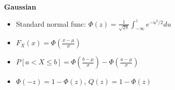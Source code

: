\documentclass[8pt]{article}
\begin{document}
\textbf{Gaussian}
\begin{itemize}
    \item Standard normal func: $\Phi(z) = \frac{1}{\sqrt{2 \pi}} \int_{-\infty}^z e^{-u^2/2} du$
    \item $F_X(x) = \Phi\left(\frac{x - \mu}{\sigma}\right)$
    \item $P[a < X \leq b] = \Phi\left(\frac{b - \mu}{\sigma}\right) - \Phi\left(\frac{a - \mu}{\sigma}\right)$
    \item $\Phi(-z) = 1 - \Phi(z)$, $Q(z) = 1 - \Phi(z)$
\end{itemize}
\end{document}
